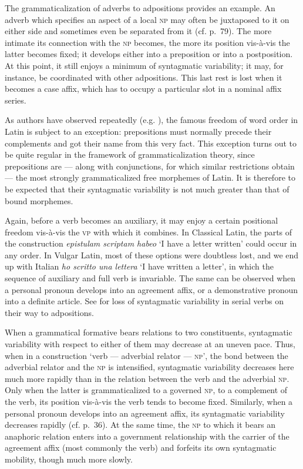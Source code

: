 The grammaticalization of adverbs to adpositions provides an example. An adverb which specifies an aspect of a local \textsc{np} may often be juxtaposed to it on either side and sometimes even be separated from it (cf. p.~79). The more intimate its connection with the \textsc{np} becomes, the more its position vis-à-vis the latter becomes fixed; it develops either into a preposition or into a postposition. At this point, it still enjoys a minimum of syntagmatic variability; it may, for instance, be coordinated with other adpositions. This last rest is lost when it becomes a case affix, which has to occupy a particular slot in a nominal affix series.

As authors have observed repeatedly (e.g. \citet[256]{Matthews1981}), the famous freedom of word order in Latin is subject to an exception: prepositions must normally precede their complements and got their name from this very fact. This exception turns out to be quite regular in the framework of grammaticalization theory, since prepositions are — along with conjunctions, for which similar restrictions obtain — the most strongly grammaticalized free morphemes of Latin. It is therefore to be expected that their syntagmatic variability is not much greater than that of bound morphemes.

Again, before a verb becomes an auxiliary, it may enjoy a certain positional freedom vis-à-vis the \textsc{vp} with which it combines. In Classical Latin, the parts of the construction \textit{epistulam scriptam habeo} ‘I have a letter written’ could occur in any order. In Vulgar Latin, most of these options were doubtless lost, and we end up with Italian \textit{ho scritto una lettera} ‘I have written a letter’, in which the sequence of auxiliary and full verb is invariable. The same can be observed when a personal pronoun develops into an agreement affix, or a demonstrative pronoun into a definite article. See \citet[84f]{Givón1975} for loss of syntagmatic variability in serial verbs on their way to adpositions.

When a grammatical formative bears relations to two constituents, syntagmatic variability with respect to either of them may decrease at an uneven pace. Thus, when in a construction ‘verb — adverbial relator — \textsc{np}’, the bond between the adverbial relator and the \textsc{np} is intensified, syntagmatic variability decreases here much more rapidly than in the relation between the verb and the adverbial \textsc{np}. Only when the latter is grammaticalized to a governed \textsc{np}, to a complement of the verb, its position vis-à-vis the verb tends to become fixed. Similarly, when a personal pronoun develops into an agreement affix, its syntagmatic variability decreases rapidly (cf. p.~36). At the same time, the \textsc{np} to which it bears an anaphoric relation enters into a government relationship with the carrier of the agreement affix (most commonly the verb) and forfeits its own syntagmatic mobility, though much more slowly.

